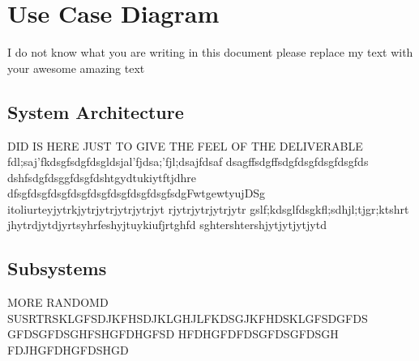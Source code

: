 \section{Use Case Diagram}
\label{sec:use_case_diagram}
I do not know what you are writing in this document please replace my text with your awesome amazing text

\subsection{System Architecture}
\label{sub:system_architecture}
DID IS HERE JUST TO GIVE THE FEEL OF THE DELIVERABLE
fdl;saj'fkdsgfsdgfdsgldsjal'fjdsa;'fjl;dsajfdsaf
dsagffsdgffsdgfdsgfdsgfdsgfds
dshfsdgfdsggfdsgfdshtgydtukiytftjdhre
dfsgfdsgfdsgfdsgfdsgfdsgfdsgfdsgfsdgFwtgewtyujDSg
itoliurteyjytrkjytrjytrjytrjytrjyt
rjytrjytrjytrjytr
gslf;kdsglfdsgkfl;sdhjl;tjgr;ktshrt
jhytrdjytdjyrtsyhrfeshyjtuykiufjrtghfd
sghtershtershjytjytjytjytd



\subsection{Subsystems}
\label{sub:subsystems}
MORE RANDOMD SUSRTRSKLGFSDJKFHSDJKLGHJLFKDSGJKFHDSKLGFSDGFDS
GFDSGFDSGHFSHGFDHGFSD
HFDHGFDFDSGFDSGFDSGH
FDJHGFDHGFDSHGD

